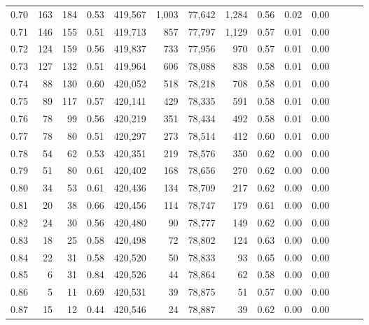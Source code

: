 \begin{tabular}{rrrrrrrrrrrrrr}
0.70 &     163 &    184 &  0.53 &  419,567 &    1,003 &  77,642 &   1,284 &  0.56 &  0.02 &      0.00 \\
0.71 &     146 &    155 &  0.51 &  419,713 &      857 &  77,797 &   1,129 &  0.57 &  0.01 &      0.00 \\
0.72 &     124 &    159 &  0.56 &  419,837 &      733 &  77,956 &     970 &  0.57 &  0.01 &      0.00 \\
0.73 &     127 &    132 &  0.51 &  419,964 &      606 &  78,088 &     838 &  0.58 &  0.01 &      0.00 \\
0.74 &      88 &    130 &  0.60 &  420,052 &      518 &  78,218 &     708 &  0.58 &  0.01 &      0.00 \\
0.75 &      89 &    117 &  0.57 &  420,141 &      429 &  78,335 &     591 &  0.58 &  0.01 &      0.00 \\
0.76 &      78 &     99 &  0.56 &  420,219 &      351 &  78,434 &     492 &  0.58 &  0.01 &      0.00 \\
0.77 &      78 &     80 &  0.51 &  420,297 &      273 &  78,514 &     412 &  0.60 &  0.01 &      0.00 \\
0.78 &      54 &     62 &  0.53 &  420,351 &      219 &  78,576 &     350 &  0.62 &  0.00 &      0.00 \\
0.79 &      51 &     80 &  0.61 &  420,402 &      168 &  78,656 &     270 &  0.62 &  0.00 &      0.00 \\
0.80 &      34 &     53 &  0.61 &  420,436 &      134 &  78,709 &     217 &  0.62 &  0.00 &      0.00 \\
0.81 &      20 &     38 &  0.66 &  420,456 &      114 &  78,747 &     179 &  0.61 &  0.00 &      0.00 \\
0.82 &      24 &     30 &  0.56 &  420,480 &       90 &  78,777 &     149 &  0.62 &  0.00 &      0.00 \\
0.83 &      18 &     25 &  0.58 &  420,498 &       72 &  78,802 &     124 &  0.63 &  0.00 &      0.00 \\
0.84 &      22 &     31 &  0.58 &  420,520 &       50 &  78,833 &      93 &  0.65 &  0.00 &      0.00 \\
0.85 &       6 &     31 &  0.84 &  420,526 &       44 &  78,864 &      62 &  0.58 &  0.00 &      0.00 \\
0.86 &       5 &     11 &  0.69 &  420,531 &       39 &  78,875 &      51 &  0.57 &  0.00 &      0.00 \\
0.87 &      15 &     12 &  0.44 &  420,546 &       24 &  78,887 &      39 &  0.62 &  0.00 &      0.00 \\

\end{tabular}
